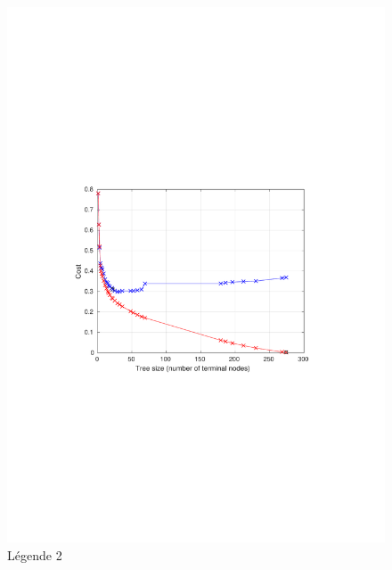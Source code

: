 \begin{figure}[t!]
   \begin{minipage}[b]{0.60\linewidth}   
      \centering \includegraphics[scale=0.20]{graphs/noisy_dataset/noisy_pruning.pdf}
      \caption{Légende 2}
   \end{minipage}

 \label{fig:cleanprunning2}
\end{figure}

